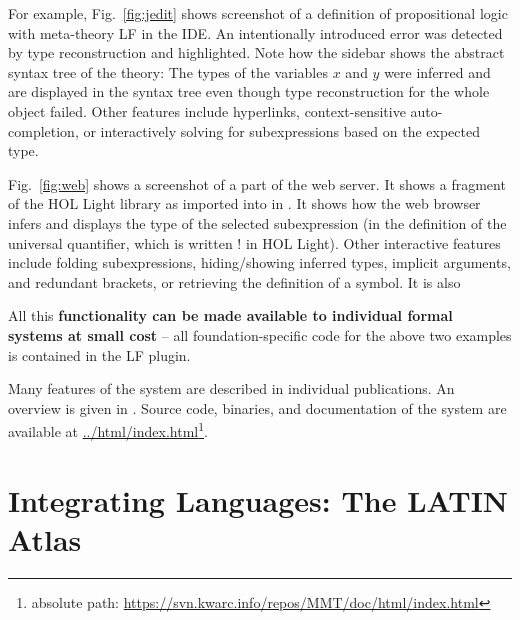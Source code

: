 For example, Fig.~\ref{fig:jedit} shows screenshot of a definition of propositional logic with meta-theory LF in the \mmt IDE.
An intentionally introduced error was detected by type reconstruction and highlighted.
Note how the sidebar shows the abstract syntax tree of the theory: The types of the variables $x$ and $y$ were inferred and are displayed in the syntax tree even though type reconstruction for the whole object failed.
Other features include hyperlinks, context-sensitive auto-completion, or interactively solving for subexpressions based on the expected type.

Fig.~\ref{fig:web} shows a screenshot of a part of the {\mmt} web server.
It shows a fragment of the HOL Light library as imported into \mmt in \cite{KR:hollight:14}.
It shows how the web browser infers and displays the type of the selected subexpression (in the definition of the universal quantifier, which is written $!$ in HOL Light).
Other interactive features include folding subexpressions, hiding/showing inferred types, implicit arguments, and redundant brackets, or retrieving the definition of a symbol.
It is also 

All this \textbf{functionality can be made available to individual formal systems at small cost} -- all foundation-specific code for the above two examples is contained in the LF plugin.
\medskip

Many features of the \mmt system are described in individual publications.
An overview is given in \cite{rabe:mmtabs:13}.
Source code, binaries, and documentation of the \mmt system are available at \url{../html/index.html}\footnote{absolute path: \url{https://svn.kwarc.info/repos/MMT/doc/html/index.html}}.

\section{Integrating Languages: The LATIN Atlas}\label{sec:atlas}

